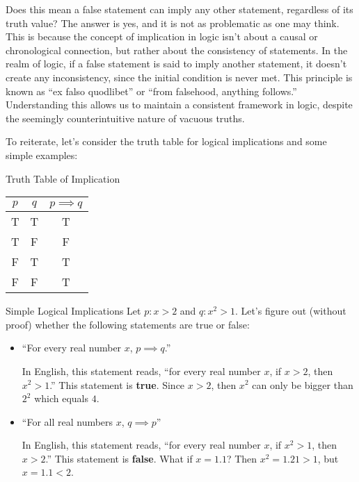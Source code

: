 \begin{notebox}
    Does this mean a false statement can imply any other statement, regardless of its truth value? The answer is yes, and it is not as problematic as one may think. This is because the concept of implication in logic isn't about a causal or chronological connection, but rather about the consistency of statements. In the realm of logic, if a false statement is said to imply another statement, it doesn't create any inconsistency, since the initial condition is never met. This principle is known as ``ex falso quodlibet'' or ``from falsehood, anything follows.'' Understanding this allows us to maintain a consistent framework in logic, despite the seemingly counterintuitive nature of vacuous truths.
\end{notebox}

To reiterate, let's consider the truth table for logical implications and some simple examples:

\begin{exbox}{Truth Table of Implication}{}
    \begin{center}\begin{tabular}{c | c || c}
        $p$ & $q$ & $p \implies q$ \\ \hline
        T & T & T \\
        T & F & F \\
        F & T & T \\
        F & F & T
    \end{tabular}\end{center}
\end{exbox}

\begin{exbox}{Simple Logical Implications}{}
    Let $p : x > 2$ and $q : x^2 > 1$. Let's figure out (without proof) whether the following statements are true or false:
    \begin{itemize}
        \item ``For every real number $x$, $p \implies q$.''

        In English, this statement reads, ``for every real number $x$, if $x > 2$, then $x^2 > 1$.'' This statement is \textbf{true}. Since $x > 2$, then $x^2$ can only be bigger than $2^2$ which equals $4$.

        \item ``For all real numbers $x$, $q \implies p$''

        In English, this statement reads, ``for every real number $x$, if $x^2 > 1$, then $x > 2$.'' This statement is \textbf{false}. What if $x = 1.1$? Then $x^2 = 1.21 > 1$, but $x = 1.1 < 2$.
    \end{itemize}
\end{exbox}

